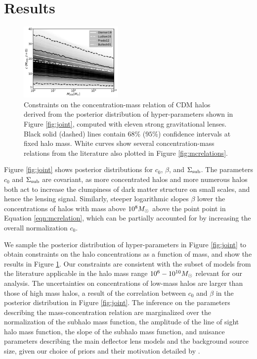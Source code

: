 \section{Results}
\label{sec:results}
\begin{figure}
	\includegraphics[clip,trim=0cm 0cm 0cm
	0cm,width=0.45\textwidth,keepaspectratio]{./figures_mcrelation/mc_summary.pdf}
	\captionsetup{width=.45\textwidth}
	\caption{\label{fig:mcphys} Constraints on the concentration-mass relation of CDM halos derived from the posterior distribution of hyper-parameters shown in Figure \ref{fig:joint}, computed with eleven strong gravitational lenses. Black solid (dashed) lines contain $68\%$ ($95\%$) confidence intervals at fixed halo mass. White curves show several concentration-mass relations from the literature also plotted in Figure \ref{fig:mcrelations}.}
\end{figure}	
Figure \ref{fig:joint} shows posterior distributions for $c_0$, $\beta$, and $\Sigma_{\rm{sub}}$. The parameters $c_0$ and $\Sigma_{\rm{sub}}$ are covariant, as more concentrated halos and more numerous halos both act to increase the clumpiness of dark matter structure on small scales, and hence the lensing signal. Similarly, steeper logarithmic slopes $\beta$ lower the concentrations of halos with mass above $10^8 {M_{\odot}}$ above the point point in Equation \ref{eqn:mcrelation}, which can be partially accounted for by increasing the overall normalization $c_0$.

We sample the posterior distribution of hyper-parameters in Figure \ref{fig:joint} to obtain constraints on the halo concentrations as a function of mass, and show the results in Figure \ref{fig:mcphys}. Our constraints are consistent with the subset of models from the literature applicable in the halo mass range $10^6 - 10^{10} {M_{\odot}}$ relevant for our analysis. The uncertainties on concentrations of low-mass halos are larger than those of high mass halos, a result of the correlation between $c_0$ and $\beta$ in the posterior distribution in Figure \ref{fig:joint}. The inference on the parameters describing the mass-concentration relation are marginalized over the normalization of the subhalo mass function, the amplitude of the line of sight halo mass function, the slope of the subhalo mass function, and nuisance parameters describing the main deflector lens models and the background source size, given our choice of priors and their motivation detailed by \cite{Gilman++19b}. 


